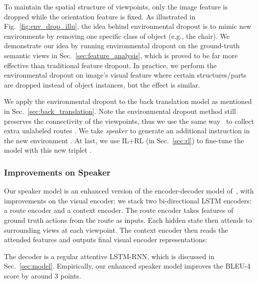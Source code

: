 \documentclass[11pt,a4paper]{article}
\begin{document}
To maintain the spatial structure of viewpoints, only the image feature  is dropped while the orientation feature  is fixed. 
As illustrated in Fig.~\ref{fig:env_drop_illu}, the idea behind environmental dropout is to mimic new environments by removing one specific class of object (e.g., the chair).
We demonstrate our idea by running environmental dropout on the ground-truth semantic views in Sec.~\ref{sec:feature_analysis}, which is proved to be far more effective than traditional feature dropout.
In practice, we perform the environmental dropout on image's visual feature where certain structures/parts are dropped instead of object instances, but the effect is similar.

We apply the environmental dropout to the back translation model as mentioned in Sec.~\ref{sec:back_translation}.
Note the environmental dropout method still preserves the connectivity of the viewpoints, thus we use the same way~\cite{fried2018speaker} to collect extra unlabeled routes . 
We take \emph{speaker} to generate an additional instruction   in the new environment .
At last, we use IL+RL (in Sec.~\ref{sec:rl}) to fine-tune the model with this new triplet .


\subsubsection{Improvements on Speaker}
\label{sec:speaker}
Our speaker model is an enhanced version of the encoder-decoder model of~, with improvements on the visual encoder: we stack two bi-directional LSTM encoders: a route encoder and a context encoder.
The route encoder takes features of ground truth actions  from the route as inputs. 
Each hidden state  then attends to surrounding views  at each viewpoint.
The context encoder then reads the attended features and outputs final visual encoder representations:

The decoder is a regular attentive LSTM-RNN, which is discussed in Sec.~\ref{sec:model}. 
Empirically, our enhanced speaker model improves the BLEU-4 score by around 3 points.
 
\end{document}
